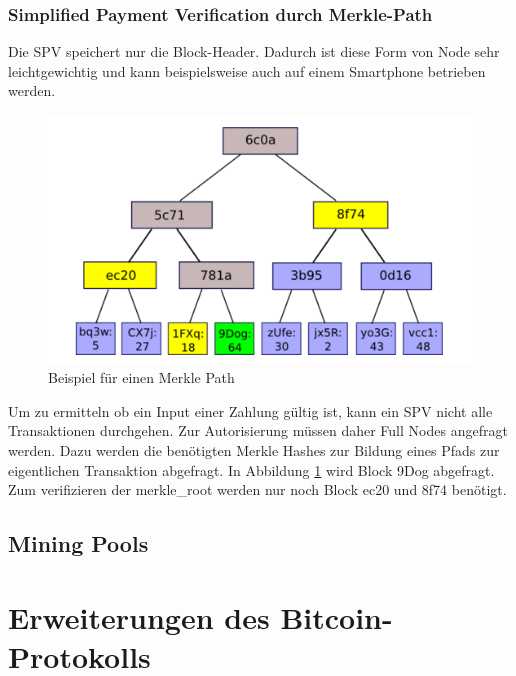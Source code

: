 \subsubsection{Simplified Payment Verification durch Merkle-Path}
Die \ac{SPV} speichert nur die Block-Header. Dadurch ist diese Form von Node sehr leichtgewichtig und kann beispielsweise auch auf einem Smartphone betrieben werden. 

\begin{figure}[ht]
	\centering
	\includegraphics[scale=0.75]{grafiken/merkle_path.png}
	\caption{Beispiel für einen Merkle Path \cite{Buterin.2014}}
	\label{Beispiel für einen Merkle Path}
\end{figure}

Um zu ermitteln ob ein Input einer Zahlung gültig ist, kann ein \ac{SPV} nicht alle Transaktionen durchgehen. Zur Autorisierung müssen daher Full Nodes angefragt werden. Dazu werden die benötigten Merkle Hashes zur Bildung eines Pfads zur eigentlichen Transaktion abgefragt. In Abbildung \ref{Beispiel für einen Merkle Path} wird Block 9Dog abgefragt. Zum verifizieren der merkle\_root werden nur noch Block ec20 und 8f74 benötigt. \cite{Buterin.2016}
\subsection{Mining Pools}
\section{Erweiterungen des Bitcoin-Protokolls}
